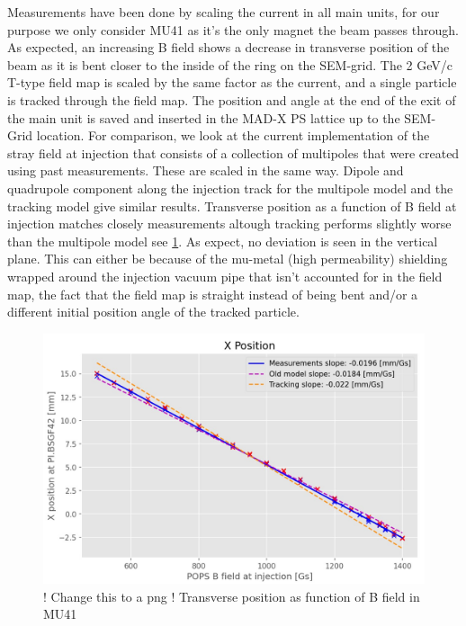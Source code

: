 \documentclass[a4paper,
               biblatex,     %
               keeplastbox,   %
               ]{jacow}
\begin{document}
Measurements have been done by scaling the current in all main units, for our purpose we only consider MU41 as it's the only magnet the beam passes through. As expected, an increasing B field shows a decrease in transverse position of the beam as it is bent closer to the inside of the ring on the SEM-grid. The 2 GeV/c T-type field map is scaled by the same factor as the current, and a single particle is tracked through the field map. The position and angle at the end of the exit of the main unit is saved and inserted in the MAD-X PS lattice up to the SEM-Grid location. For comparison, we look at the current implementation of the stray field at injection that consists of a collection of multipoles that were created using past measurements. These are scaled in the same way. Dipole and quadrupole component along the injection track for the multipole model and the tracking model give similar results. Transverse position as a function of B field at injection matches closely measurements altough tracking performs slightly worse than the multipole model see \ref{fig:injection_btp_transverse_position}. As expect, no deviation is seen in the vertical plane. This can either be because of the mu-metal (high permeability) shielding wrapped around the injection vacuum pipe that isn't accounted for in the field map, the fact that the field map is straight instead of being bent and/or a different initial position angle of the tracked particle.

\begin{figure}[!htb]
   \centering
   \includegraphics*[width=1.0\columnwidth]{injection_btp_transverse_position.jpg}
   \caption{! Change this to a png ! Transverse position as function of B field in MU41}
   \label{fig:injection_btp_transverse_position}
\end{figure}
\end{document}
